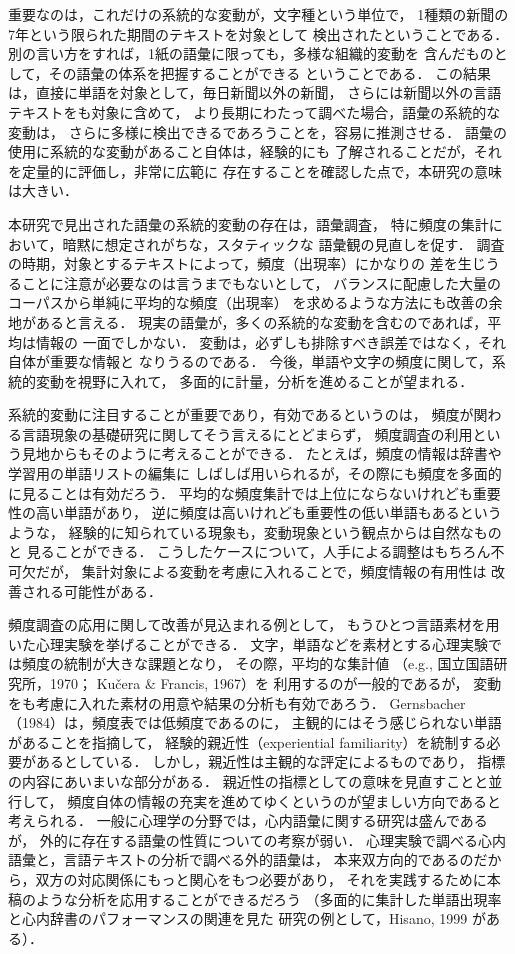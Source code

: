   重要なのは，これだけの系統的な変動が，文字種という単位で，
1種類の新聞の7年という限られた期間のテキストを対象として
検出されたということである．
別の言い方をすれば，1紙の語彙に限っても，多様な組織的変動を
含んだものとして，その語彙の体系を把握することができる
ということである．
この結果は，直接に単語を対象として，毎日新聞以外の新聞，
さらには新聞以外の言語テキストをも対象に含めて，
より長期にわたって調べた場合，語彙の系統的な変動は，
さらに多様に検出できるであろうことを，容易に推測させる．
語彙の使用に系統的な変動があること自体は，経験的にも
了解されることだが，それを定量的に評価し，非常に広範に
存在することを確認した点で，本研究の意味は大きい．

  本研究で見出された語彙の系統的変動の存在は，語彙調査，
特に頻度の集計において，暗黙に想定されがちな，スタティックな
語彙観の見直しを促す．
調査の時期，対象とするテキストによって，頻度（出現率）にかなりの
差を生じうることに注意が必要なのは言うまでもないとして，
バランスに配慮した大量のコーパスから単純に平均的な頻度（出現率）
を求めるような方法にも改善の余地があると言える．
現実の語彙が，多くの系統的な変動を含むのであれば，平均は情報の
一面でしかない．
変動は，必ずしも排除すべき誤差ではなく，それ自体が重要な情報と
なりうるのである．
今後，単語や文字の頻度に関して，系統的変動を視野に入れて，
多面的に計量，分析を進めることが望まれる．

  系統的変動に注目することが重要であり，有効であるというのは，
頻度が関わる言語現象の基礎研究に関してそう言えるにとどまらず，
頻度調査の利用という見地からもそのように考えることができる．
たとえば，頻度の情報は辞書や学習用の単語リストの編集に
しばしば用いられるが，その際にも頻度を多面的に見ることは有効だろう．
平均的な頻度集計では上位にならないけれども重要性の高い単語があり，
逆に頻度は高いけれども重要性の低い単語もあるというような，
経験的に知られている現象も，変動現象という観点からは自然なものと
見ることができる．
こうしたケースについて，人手による調整はもちろん不可欠だが，
集計対象による変動を考慮に入れることで，頻度情報の有用性は
改善される可能性がある．

  頻度調査の応用に関して改善が見込まれる例として，
もうひとつ言語素材を用いた心理実験を挙げることができる．
文字，単語などを素材とする心理実験では頻度の統制が大きな課題となり，
その際，平均的な集計値
（e.g., 国立国語研究所，1970； Ku\v{c}era \& Francis, 1967）を
利用するのが一般的であるが，
変動をも考慮に入れた素材の用意や結果の分析も有効であろう．
Gernsbacher（1984）は，頻度表では低頻度であるのに，
主観的にはそう感じられない単語があることを指摘して，
経験的親近性（experiential familiarity）を統制する必要があるとしている．
しかし，親近性は主観的な評定によるものであり，
指標の内容にあいまいな部分がある．
親近性の指標としての意味を見直すことと並行して，
頻度自体の情報の充実を進めてゆくというのが望ましい方向であると考えられる．
一般に心理学の分野では，心内語彙に関する研究は盛んであるが，
外的に存在する語彙の性質についての考察が弱い．
心理実験で調べる心内語彙と，言語テキストの分析で調べる外的語彙は，
本来双方向的であるのだから，双方の対応関係にもっと関心をもつ必要があり，
それを実践するために本稿のような分析を応用することができるだろう
（多面的に集計した単語出現率と心内辞書のパフォーマンスの関連を見た
研究の例として，Hisano, 1999 がある）．



